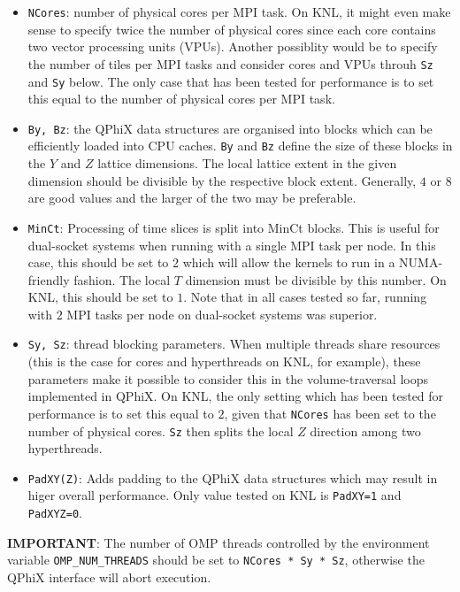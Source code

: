\begin{itemize}
  \item{\texttt{NCores}: number of physical cores per MPI task. On KNL, it might even make sense to specify twice the number of physical cores since each core contains two vector processing units (VPUs). Another possiblity would be to specify the number of tiles per MPI tasks and consider cores and VPUs throuh \texttt{Sz} and \texttt{Sy} below. The only case that has been tested for performance is to set this equal to the number of physical cores per MPI task.}
  \item{\texttt{By, Bz}: the QPhiX data structures are organised into blocks which can be efficiently loaded into CPU caches. \texttt{By} and \texttt{Bz} define the size of these blocks in the $Y$ and $Z$ lattice dimensions. The local lattice extent in the given dimension should be divisible by the respective block extent. Generally, $4$ or $8$ are good values and the larger of the two may be preferable.}
  \item{\texttt{MinCt}: Processing of time slices is split into MinCt blocks. This is useful for dual-socket systems when running with a single MPI task per node. In this case, this should be set to $2$ which will allow the kernels to run in a NUMA-friendly fashion. The local $T$ dimension must be divisible by this number. On KNL, this should be set to $1$. Note that in all cases tested so far, running with $2$ MPI tasks per node on dual-socket systems was superior.}
  \item{\texttt{Sy, Sz}: thread blocking parameters. When multiple threads share resources (this is the case for cores and hyperthreads on KNL, for example), these parameters make it possible to consider this in the volume-traversal loops implemented in QPhiX. On KNL, the only setting which has been tested for performance is to set this equal to $2$, given that \texttt{NCores} has been set to the number of physical cores. \texttt{Sz} then splits the local $Z$ direction among two hyperthreads.}
  \item{\texttt{PadXY(Z)}: Adds padding to the QPhiX data structures which may result in higer overall performance. Only value tested on KNL is \texttt{PadXY=1} and \texttt{PadXYZ=0}.}
\end{itemize}

\noindent\textbf{IMPORTANT}: The number of OMP threads controlled by the environment variable \texttt{OMP\_NUM\_THREADS} should be set to \texttt{NCores * Sy * Sz}, otherwise the QPhiX interface will abort execution.

